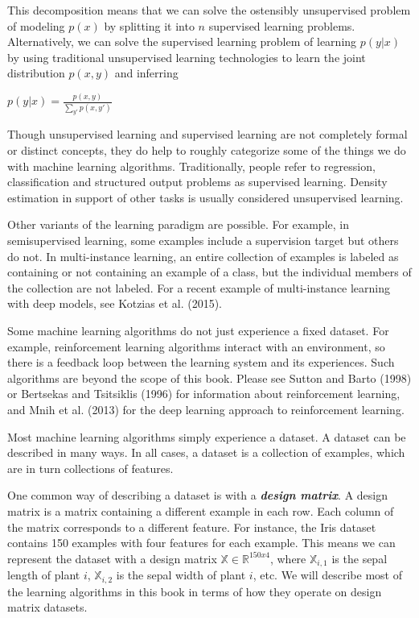 \documentclass{report}
\begin{document}
This decomposition means that we can solve the ostensibly unsupervised problem of modeling $p(x)$ by splitting it into $n$ supervised learning problems. Alternatively, we can solve the supervised learning problem of learning $p(y|x)$ by using traditional unsupervised learning technologies to learn the joint distribution $p(x,y)$ and inferring\newline\newline
\centerline{$p(y|x)=\frac{p(x,y)}{\sum_{y'}p(x,y')}$}\newline

\noindent Though unsupervised learning and supervised learning are not completely formal or distinct concepts, they do help to roughly categorize some of the things we do with machine learning algorithms. Traditionally, people refer to regression, classification and structured output problems as supervised learning. Density estimation in support of other tasks is usually considered unsupervised learning.\newline

\noindent Other variants of the learning paradigm are possible. For example, in semisupervised learning, some examples include a supervision target but others do not. In multi-instance learning, an entire collection of examples is labeled as containing or not containing an example of a class, but the individual members of the collection are not labeled. For a recent example of multi-instance learning with deep models, see Kotzias et al. (2015).\newline

\noindent Some machine learning algorithms do not just experience a fixed dataset. For example, reinforcement learning algorithms interact with an environment, so there is a feedback loop between the learning system and its experiences. Such algorithms are beyond the scope of this book. Please see Sutton and Barto (1998) or Bertsekas and Tsitsiklis (1996) for information about reinforcement learning, and Mnih et al. (2013) for the deep learning approach to reinforcement learning.\newline

\noindent Most machine learning algorithms simply experience a dataset. A dataset can be described in many ways. In all cases, a dataset is a collection of examples, which are in turn collections of features.\newline

\noindent One common way of describing a dataset is with a \textbf{\textit{design matrix}}. A design matrix is a matrix containing a different example in each row. Each column of the matrix corresponds to a different feature. For instance, the Iris dataset contains 150 examples with four features for each example. This means we can represent the dataset with a design matrix $\mathbb{X} \in \mathbb{R}^{150x4}$, where $\mathbb{X}_{i,1}$ is the sepal length of plant $i$, $\mathbb{X}_{i,2}$ is the sepal width of plant $i$, etc. We will describe most of the learning algorithms in this book in terms of how they operate on design matrix datasets.\newline
\end{document}

